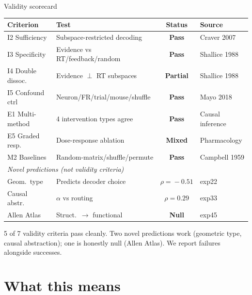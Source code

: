 \documentclass[aspectratio=169,11pt]{beamer}
\begin{document}
\begin{frame}{Validity scorecard}
{\small
\begin{tabular}{llcl}
\toprule
\textbf{Criterion} & \textbf{Test} & \textbf{Status} & \textbf{Source} \\
\midrule
I2 Sufficiency & Subspace-restricted decoding & \textcolor{pass}{\textbf{Pass}} & Craver 2007 \\
I3 Specificity & Evidence vs RT/feedback/random & \textcolor{pass}{\textbf{Pass}} & Shallice 1988 \\
I4 Double dissoc. & Evidence $\perp$ RT subspaces & \textcolor{partial}{\textbf{Partial}} & Shallice 1988 \\
I5 Confound ctrl & Neuron/FR/trial/mouse/shuffle & \textcolor{pass}{\textbf{Pass}} & Mayo 2018 \\
E1 Multi-method & 4 intervention types agree & \textcolor{pass}{\textbf{Pass}} & Causal inference \\
E5 Graded resp. & Dose-response ablation & \textcolor{partial}{\textbf{Mixed}} & Pharmacology \\
M2 Baselines & Random-matrix/shuffle/permute & \textcolor{pass}{\textbf{Pass}} & Campbell 1959 \\
\midrule
\multicolumn{4}{l}{\textit{Novel predictions (not validity criteria)}} \\
Geom.\ type & Predicts decoder choice & \textcolor{pass}{\textbf{$\rho\!=\!-0.51$}} & exp22 \\
Causal abstr.\ & $\alpha$ vs routing & \textcolor{partial}{\textbf{$\rho\!=\!0.29$}} & exp33 \\
Allen Atlas & Struct.\ $\to$ functional & \textcolor{fail}{\textbf{Null}} & exp45 \\
\bottomrule
\end{tabular}
}

\vspace{0.8em}
5 of 7 validity criteria pass cleanly. Two novel predictions work (geometric type, causal abstraction); one is honestly null (Allen Atlas). We report failures alongside successes.
\end{frame}

\section{What this means}
\end{document}
